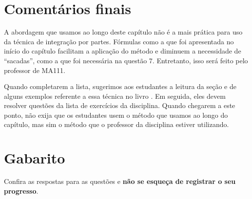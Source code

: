 \documentclass[main_estudante.tex]{subfiles}
\begin{document}
\paraTutores

\section{Comentários finais}

A abordagem que usamos ao longo deste capítulo não é a mais prática para uso da técnica de integração por partes. Fórmulas como a que foi apresentada no início do capítulo facilitam a aplicação do método e diminuem a necessidade de ``sacadas'', como a que foi necessária na questão 7. Entretanto, isso será feito pelo professor de MA111.

Quando completarem a lista, sugerimos aos estudantes a leitura da seção e de alguns exemplos referente a essa técnica no livro . Em seguida, eles devem resolver questões da lista de exercícios da disciplina. Quando chegarem a este ponto, não exija que os estudantes usem o método que usamos ao longo do capítulo, mas sim o método que o professor da disciplina estiver utilizando.

\paraAmbos

\section{Gabarito}

Confira as respostas para as questões e \textbf{não se esqueça de registrar o seu progresso}.

\imprimeGabarito

\paraAmbos
\end{document}
